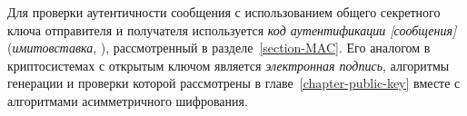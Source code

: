 Для проверки аутентичности сообщения с использованием общего секретного ключа отправителя и получателя используется \emph{код аутентификации [сообщения]} (\emph{имитовставка}, ), рассмотренный в разделе~\ref{section-MAC}. Его аналогом в криптосистемах с открытым ключом является \emph{электронная подпись}, алгоритмы генерации и проверки которой рассмотрены в главе~\ref{chapter-public-key} вместе с алгоритмами асимметричного шифрования.
